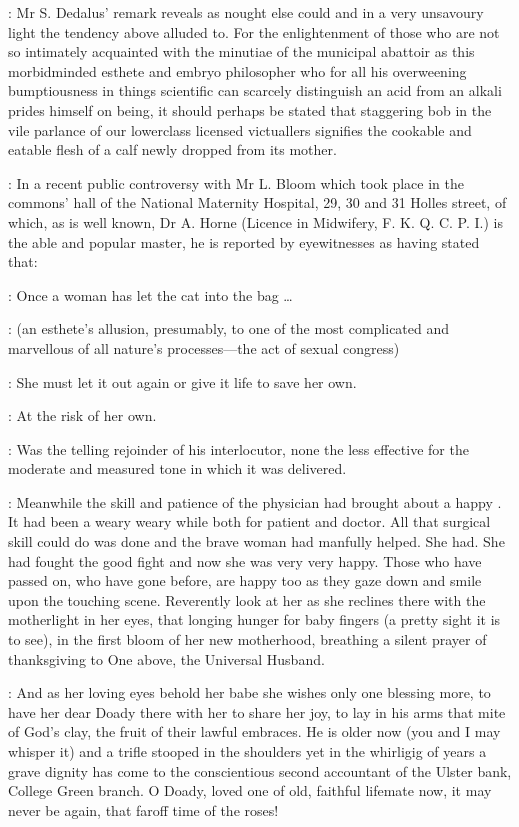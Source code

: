 \documentclass[12pt]{article}
\begin{document}
: Mr S. Dedalus' remark reveals as
nought else could and in a very unsavoury light the tendency above
alluded to. For the enlightenment of those who are not so intimately
acquainted with the minutiae of the municipal abattoir as this
morbidminded esthete and embryo philosopher who for all his overweening
bumptiousness in things scientific can scarcely distinguish an acid from
an alkali prides himself on being, it should perhaps be stated that
staggering bob in the vile parlance of our lowerclass licensed
victuallers signifies the cookable and eatable flesh of a calf newly
dropped from its mother.

: In a recent public controversy with Mr L. Bloom
which took place in the commons' hall of the National
Maternity Hospital, 29, 30 and 31 Holles street, of which, as is well
known, Dr A. Horne (Licence in Midwifery, F. K. Q. C. P. I.) is the able and
popular master, he is reported by eyewitnesses as having stated that:

\SD: Once a woman has let the cat into the bag \dots

: (an esthete's allusion, presumably,
to one of the most complicated and marvellous of all nature's processes---the
act of sexual congress)

\SD: She must let it out again or give it life to save her own.

\Bl: At the risk of her own.

: Was the telling rejoinder of his interlocutor, none the less
effective for the moderate and measured tone in which it was delivered.


: Meanwhile the skill and patience of the physician had brought about a
happy . It had been a weary weary while both for
patient and doctor. All that surgical skill could do was done and the
brave woman had manfully helped. She had. She had fought the good fight
and now she was very very happy. Those who have passed on, who have gone
before, are happy too as they gaze down and smile upon the touching scene.
Reverently look at her as she reclines there with the motherlight in her
eyes, that longing hunger for baby fingers (a pretty sight it is to see),
in the first bloom of her new motherhood, breathing a silent prayer of
thanksgiving to One above, the Universal Husband.

: And as her loving eyes behold her babe she wishes only one blessing
more, to have her dear Doady there with her to share her joy, to lay in
his arms that mite of God's clay, the fruit of their lawful embraces. He
is older now (you and I may whisper it) and a trifle stooped in the
shoulders yet in the whirligig of years a grave dignity has come to the
conscientious second accountant of the Ulster bank, College Green branch.
O Doady, loved one of old, faithful lifemate now, it may never be again,
that faroff time of the roses!
\end{document}
